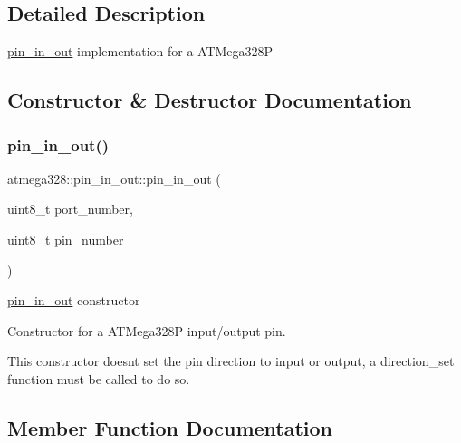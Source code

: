 \subsection{Detailed Description}
\hyperlink{classatmega328_1_1pin__in__out}{pin\+\_\+in\+\_\+out} implementation for a A\+T\+Mega328P 

\subsection{Constructor \& Destructor Documentation}
\mbox{\label{classatmega328_1_1pin__in__out_a438a355294e59a4f1b0f4f9ac35cebbb}} 
\subsubsection{\texorpdfstring{pin\+\_\+in\+\_\+out()}{pin\_in\_out()}}
{\footnotesize\ttfamily atmega328\+::pin\+\_\+in\+\_\+out\+::pin\+\_\+in\+\_\+out (\begin{DoxyParamCaption}\item[{uint8\+\_\+t}]{port\+\_\+number,  }\item[{uint8\+\_\+t}]{pin\+\_\+number }\end{DoxyParamCaption})\hspace{0.3cm}{\ttfamily [inline]}}

\hyperlink{classatmega328_1_1pin__in__out}{pin\+\_\+in\+\_\+out} constructor

Constructor for a A\+T\+Mega328P input/output pin.

This constructor doesn\textquotesingle{}t set the pin direction to input or output, a direction\+\_\+set function must be called to do so. 

\subsection{Member Function Documentation}
\mbox{\label{classatmega328_1_1pin__in__out_a84bd2629cbf56882ae9cb986c928d33e}} 
